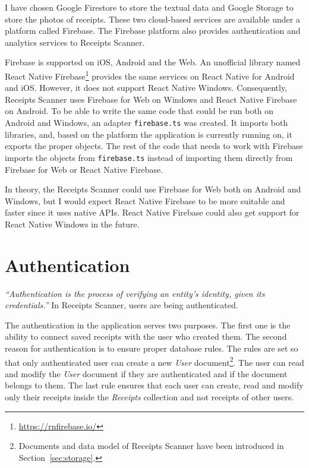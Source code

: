 \documentclass[
  digital, %
  table,   %
  oneside, %
  lof,     %
  lot,     %
]{fithesis3}
\begin{document}
I have chosen Google Firestore to store the textual data and Google Storage to store the photos of receipts. These two cloud-based services are available under a platform called Firebase. The Firebase platform also provides authentication and analytics services to Receipts Scanner.

\label{phantom:firebase_adapter}
Firebase is supported on iOS, Android and the Web. An unofficial library named React Native Firebase\footnote{\url{https://rnfirebase.io/}} provides the same services on React Native for Android and iOS. However, it does not support React Native Windows. Consequently, Receipts Scanner uses Firebase for Web on Windows and React Native Firebase on Android. To be able to write the same code that could be run both on Android and Windows, an adapter \texttt{firebase.ts} was created. It imports both libraries, and, based on the platform the application is currently running on, it exports the proper objects. The rest of the code that needs to work with Firebase imports the objects from \texttt{firebase.ts} instead of importing them directly from Firebase for Web or React Native Firebase.

In theory, the Receipts Scanner could use Firebase for Web both on Android and Windows, but I would expect React Native Firebase to be more suitable and faster since it uses native APIs. React Native Firebase could also get support for React Native Windows in the future.

\section{Authentication}
\label{ref:authentication}
\textit{``Authentication is the process of verifying an entity’s identity, given its credentials.''} \cite{Cankaya2011Authentication} In Receipts Scanner, users are being authenticated.

The authentication in the application serves two purposes. The first one is the ability to connect saved receipts with the user who created them. The second reason for authentication is to ensure proper database rules. The rules are set so that only authenticated user can create a new \textit{User} document\footnote{Documents and data model of Receipts Scanner have been introduced in Section~\ref{sec:storage}.}. The user can read and modify the \textit{User} document if they are authenticated and if the document belongs to them. The last rule ensures that each user can create, read and modify only their receipts inside the \textit{Receipts} collection and not receipts of other users.
\end{document}
